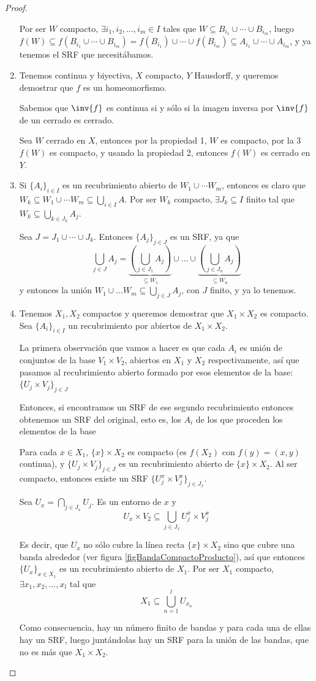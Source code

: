 \documentclass{apuntes}
\begin{document}
\begin{proof}
\begin{enumerate}
	Por ser $W$ compacto, $∃i_1, i_2, \dotsc, i_m ∈ I$ tales que $W⊆B_{i_1} ∪ \dotsb ∪ B_{i_m}$, luego $f(W) ⊆ f(B_{i_1} ∪ \dotsb ∪ B_{i_m}) = f(B_{i_1}) ∪ \dotsb ∪ f(B_{i_m}) ⊆ A_{i_1} ∪ \dotsb ∪ A_{i_m}$, y ya tenemos el SRF que necesitábamos.
	\item Tenemos \stdf continua y biyectiva, $X$ compacto, $Y$ Hausdorff, y queremos demostrar que $f$ es un homeomorfismo.

	Sabemos que $\inv{f}$ es continua si y sólo si la imagen inversa por $\inv{f}$ de un cerrado es cerrado.

	Sea $W$ cerrado en $X$, entonces por la propiedad 1, $W$ es compacto, por la 3 $f(W)$ es compacto, y usando la propiedad 2, entonces $f(W)$ es cerrado en $Y$.
	\item Si $\{A_i\}_{i∈I}$ es un recubrimiento abierto de $W_1 ∪ \dotsb W_m$, entonces es claro que $W_k ⊆ W_1 ∪ \dotsb W_m ⊆ \bigcup_{i∈I} A$. Por ser $W_k$ compacto, $∃J_k ⊆ I$ finito tal que $W_k ⊆ \bigcup_{k∈J_k} A_j$.

	Sea $J = J_1 ∪ \dotsb ∪ J_k$. Entonces $\{A_j\}_{j∈J}$ es un SRF, ya que \[ \bigcup_{j∈J} A_j = \underbrace{\left(\bigcup_{j∈J_1} A_j\right)}_{⊆W_1} ∪ \dotsc ∪ \underbrace{\left(\bigcup_{j∈J_n} A_j\right)}_{⊆W_n} \] y entonces la unión $W_1 ∪ \dotsc W_m ⊆ \bigcup_{j∈J} A_j$, con $J$ finito, y ya lo tenemos.
	\item Tenemos $X_1, X_2$ compactos y queremos demostrar que $X_1×X_2$ es compacto. Sea $\{A_i\}_{i∈I}$ un recubrimiento por abiertos de $X_1×X_2$. 

	La primera observación que vamos a hacer es que cada $A_i$ es unión de conjuntos de la base $V_1×V_2$, abiertos en $X_1$ y $X_2$ respectivamente, así que pasamos al recubrimiento abierto formado por esos elementos de la base: $\{U_j×V_j\}_{j∈J}$

	Entonces, si encontramos un SRF de ese segundo recubrimiento entonces obtenemos un SRF del original, esto es, los $A_i$ de los que proceden los elementos de la base

	Para cada $x∈X_1$, $\{x\}×X_2$ es compacto (es $f(X_2)$ con $f(y) = (x,y)$ continua), y $\{U_j×V_j\}_{j∈J}$ es un recubrimiento abierto de $\{x\}×X_2$. Al ser compacto, entonces existe un SRF $\{U_j^x×V_j^x\}_{j∈J_x}$. 

	Sea $U_x = \bigcap_{j∈J_x} U_j$. Es un entorno de $x$ y \[ U_x×V_2 ⊆ \bigcup_{j∈J_x}U^x_j × V_j^x \] 

	Es decir, que $U_x$ no sólo cubre la línea recta $\{x\}×X_2$ sino que cubre una banda alrededor (ver figura \ref{figBandaCompactoProducto}), así que entonces $\{U_x\}_{x∈X_1}$ es un recubrimiento abierto de $X_1$. Por ser $X_1$ compacto, $∃x_1, x_2,\dotsc, x_l$ tal que \[ X_1⊆ \bigcup_{n=1}^l U_{x_n}\]

	Como consecuencia, hay un número finito de bandas y para cada una de ellas hay un SRF, luego juntándolas hay un SRF para la unión de las bandas, que no es más que $X_1×X_2$.
\end{enumerate}
\end{proof}
\end{document}
